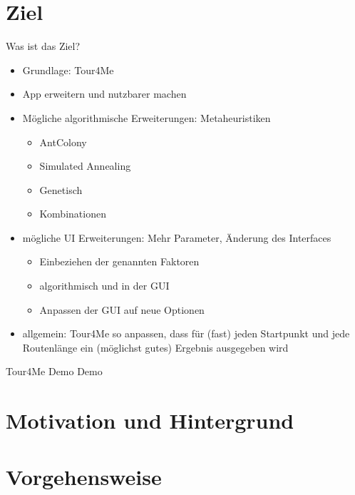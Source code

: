 \documentclass[aspectratio=169,xcolor=dvipsnames, t]{beamer}
\begin{document}
	\section{Ziel}
	
	\begin{frame}
		Was ist das Ziel?
		\begin{itemize}[<+->]
			\item Grundlage: Tour4Me
			\item App erweitern und nutzbarer machen
			\item Mögliche algorithmische Erweiterungen: Metaheuristiken
			\begin{itemize}[<+->]
				\item AntColony
				\item Simulated Annealing
				\item Genetisch
				\item Kombinationen
			\end{itemize}
			\item mögliche UI Erweiterungen: Mehr Parameter, Änderung des Interfaces
			\begin{itemize}[<+->]
				\item Einbeziehen der genannten Faktoren
				\item algorithmisch und in der GUI
				\item Anpassen der GUI auf neue Optionen
			\end{itemize}
			\item allgemein: Tour4Me so anpassen, dass für (fast) jeden Startpunkt und jede Routenlänge ein (möglichst gutes) Ergebnis ausgegeben wird
		\end{itemize}
	\end{frame}
	
	\begin{frame}{Tour4Me Demo}
		\centering
		\vspace{2cm}
		\Huge Demo
	\end{frame}
	
	
	\section{Motivation und Hintergrund}
	
	\begin{frame}
		
	\end{frame}
	
	
	\section{Vorgehensweise}
	
\end{document}
